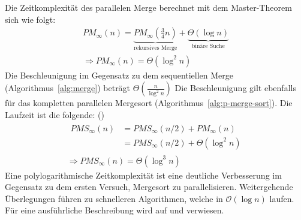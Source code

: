 Die Zeitkomplexität des parallelen Merge berechnet mit dem Master-Theorem sich
wie folgt:
\begin{equation}
    \begin{gathered}
        PM_\infty(n) =
        \underbrace{PM_\infty\left( \frac{3}{4}n \right)}_{\text{rekursives Merge}}
        + \underbrace{\Theta(\log n)}_{\text{binäre Suche}}
        \\
        \Rightarrow PM_\infty(n) = \Theta(\log^2 n)
    \end{gathered}
\end{equation}
Die Beschleunigung im Gegensatz zu dem sequentiellen Merge
(Algorithmus~\ref{alg:merge}) beträgt $\Theta(\frac{n}{\log^2 n})$
Die Beschleunigung gilt ebenfalls für das kompletten parallelen Mergesort
(Algorithmus~\ref{alg:p-merge-sort}).
Die Laufzeit ist die folgende: (\cite[S.803f.]{cormen})
\begin{equation}
    \begin{gathered}
        \begin{aligned}
            PMS_\infty (n) &= PMS_\infty(n/2) + PM_\infty(n) \\
            &= PMS_\infty(n/2) + \Theta(\log^2 n)
        \end{aligned} \\
        \Rightarrow PMS_\infty(n) = \Theta(\log^3 n)
    \end{gathered}
\end{equation}
Eine polylogarithmische Zeitkomplexität ist eine deutliche Verbesserung im
Gegensatz zu dem ersten Versuch, Mergesort zu parallelisieren.
Weitergehende Überlegungen führen zu schnelleren Algorithmen, welche in
$\mathcal{O}(\log n)$ laufen.
Für eine ausführliche Beschreibung wird auf \cite[Kapitel 10]{reif} und
\cite[S.163ff.]{jaja} verwiesen.
